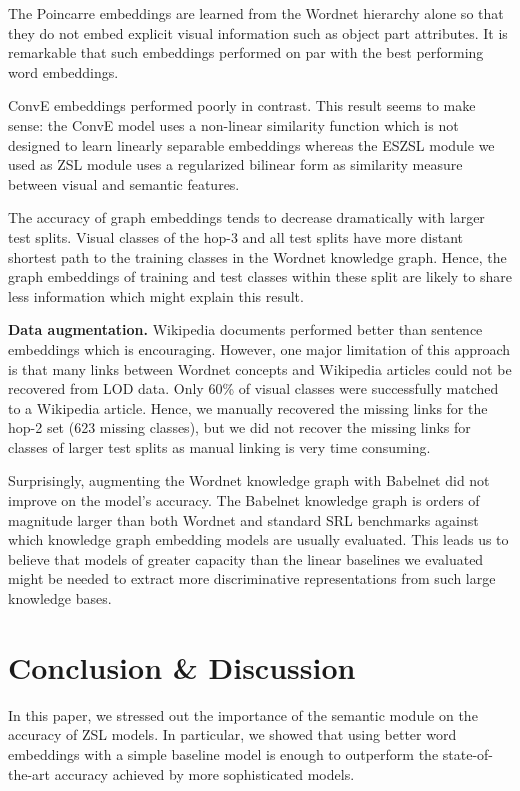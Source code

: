 The Poincarre embeddings are learned from the Wordnet hierarchy alone so that they do not embed explicit visual information such as object part attributes. It is remarkable that such embeddings performed on par with the best performing word embeddings. 

ConvE embeddings performed poorly in contrast. This result seems to make sense: the ConvE model uses a non-linear similarity function which is not designed to learn linearly separable embeddings whereas the ESZSL module \cite{romera2015embarrassingly} we used as ZSL module uses a regularized bilinear form as similarity measure between visual and semantic features.

The accuracy of graph embeddings tends to decrease dramatically with larger test splits. Visual classes of the hop-3 and all test splits have more distant shortest path to the training classes in the Wordnet knowledge graph. Hence, the graph embeddings of training and test classes within these split are likely to share less information which might explain this result. 

\textbf{Data augmentation.} Wikipedia documents performed better than sentence embeddings which is encouraging. However, one major limitation of this approach is that many links between Wordnet concepts and Wikipedia articles could not be recovered from LOD data. Only 60\% of visual classes were successfully matched to a Wikipedia article. Hence, we manually recovered the missing links for the hop-2 set (623 missing classes), but we did not recover the missing links for classes of larger test splits as manual linking is very time consuming.

Surprisingly, augmenting the Wordnet knowledge graph with Babelnet did not improve on the model's accuracy. The Babelnet knowledge graph is orders of magnitude larger than both Wordnet and standard SRL benchmarks against which knowledge graph embedding models are usually evaluated. This leads us to believe that models of greater capacity than the linear baselines we evaluated might be needed to extract more discriminative representations from such large knowledge bases. 

\section{Conclusion \& Discussion}
In this paper, we stressed out the importance of the semantic module on the accuracy of ZSL models. In particular, we showed that using better word embeddings with a simple baseline model is enough to outperform the state-of-the-art accuracy achieved by more sophisticated models. 

